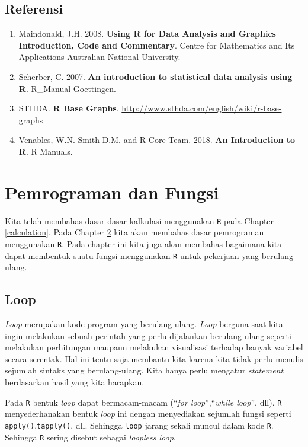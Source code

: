 \documentclass[
]{book}
\providecommand{\tightlist}{%
  \setlength{\itemsep}{0pt}\setlength{\parskip}{0pt}}
\theoremstyle{definition}
\theoremstyle{definition}
\theoremstyle{definition}
\theoremstyle{definition}
\theoremstyle{remark}
\begin{document}
\hypertarget{referensi-2}{%
\section{Referensi}\label{referensi-2}}

\begin{enumerate}
\def\labelenumi{\arabic{enumi}.}
\tightlist
\item
  Maindonald, J.H. 2008. \textbf{Using R for Data Analysis and Graphics Introduction, Code and Commentary}. Centre for Mathematics and Its Applications Australian National University.
\item
  Scherber, C. 2007. \textbf{An introduction to statistical data analysis using R}. R\_Manual Goettingen.
\item
  STHDA. \textbf{R Base Graphs}. \url{http://www.sthda.com/english/wiki/r-base-graphs}
\item
  Venables, W.N. Smith D.M. and R Core Team. 2018. \textbf{An Introduction to R}. R Manuals.
\end{enumerate}

\hypertarget{programmingandfunction}{%
\chapter{Pemrograman dan Fungsi}\label{programmingandfunction}}

Kita telah membahas dasar-dasar kalkulasi menggunakan \texttt{R} pada Chapter \ref{calculation}. Pada Chapter \ref{programmingandfunction} kita akan membahas dasar pemrograman menggunakan \texttt{R}. Pada chapter ini kita juga akan membahas bagaimana kita dapat membentuk suatu fungsi menggunakan \texttt{R} untuk pekerjaan yang berulang-ulang.

\hypertarget{loop}{%
\section{Loop}\label{loop}}

\emph{Loop} merupakan kode program yang berulang-ulang. \emph{Loop} berguna saat kita ingin melakukan sebuah perintah yang perlu dijalankan berulang-ulang seperti melakukan perhitungan maupaun melakukan visualisasi terhadap banyak variabel secara serentak. Hal ini tentu saja membantu kita karena kita tidak perlu menulis sejumlah sintaks yang berulang-ulang. Kita hanya perlu mengatur \emph{statement} berdasarkan hasil yang kita harapkan.

Pada \texttt{R} bentuk \emph{loop} dapat bermacam-macam (``\emph{for loop}'',``\emph{while loop}'', dll). \texttt{R} menyederhanakan bentuk \emph{loop} ini dengan menyediakan sejumlah fungsi seperti \texttt{apply()},\texttt{tapply()}, dll. Sehingga \texttt{loop} jarang sekali muncul dalam kode \texttt{R}. Sehingga \texttt{R} sering disebut sebagai \emph{loopless loop}.
\end{document}
